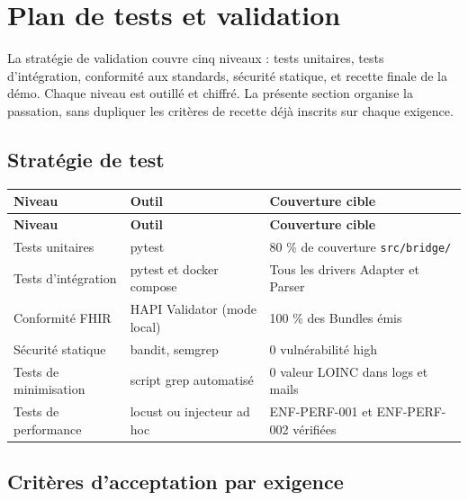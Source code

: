 \chapter{Plan de tests et validation}
\label{ch:tests-validation}

La stratégie de validation couvre cinq niveaux : tests unitaires, tests d'intégration, conformité aux standards, sécurité statique, et recette finale de la démo. Chaque niveau est outillé et chiffré. La présente section organise la passation, sans dupliquer les critères de recette déjà inscrits sur chaque exigence.

\section{Stratégie de test}
\label{sec:strategie-test}

\bridgezebra
\begin{longtable}{p{4cm}p{5cm}p{6cm}}
  \toprule
  \rowcolor{bridgeblue!90}
  {\color{white}\bfseries Niveau} & {\color{white}\bfseries Outil} & {\color{white}\bfseries Couverture cible} \\
  \midrule
  \endfirsthead
  \toprule
  \rowcolor{bridgeblue!90}
  {\color{white}\bfseries Niveau} & {\color{white}\bfseries Outil} & {\color{white}\bfseries Couverture cible} \\
  \midrule
  \endhead
  \bottomrule
  \endfoot
  Tests unitaires             & pytest                             & 80 \% de couverture \texttt{src/bridge/} \\
  Tests d'intégration         & pytest et docker compose           & Tous les drivers Adapter et Parser \\
  Conformité FHIR             & HAPI Validator (mode local)        & 100 \% des Bundles émis \\
  Sécurité statique           & bandit, semgrep                    & 0 vulnérabilité high \\
  Tests de minimisation       & script grep automatisé             & 0 valeur LOINC dans logs et mails \\
  Tests de performance        & locust ou injecteur ad hoc         & ENF-PERF-001 et ENF-PERF-002 vérifiées \\
\end{longtable}

\section{Critères d'acceptation par exigence}
\label{sec:criteres-acceptation}

